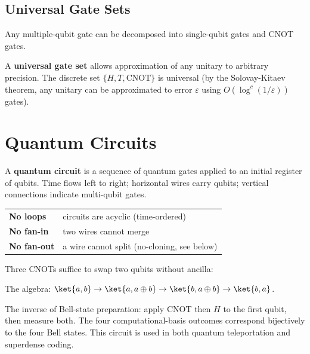 \documentclass[oneside]{academica}
\begin{document}
\subsection{Universal Gate Sets}

\begin{theorem*}
  Any multiple-qubit gate can be decomposed into single-qubit gates and CNOT gates.
\end{theorem*}

A \textbf{universal gate set} allows approximation of any unitary to arbitrary precision.
The discrete set $\{H, T, \mathrm{CNOT}\}$ is universal (by the Solovay-Kitaev theorem, any unitary can be approximated to error $\varepsilon$ using $O(\log^c(1/\varepsilon))$ gates).

\section{Quantum Circuits}

A \textbf{quantum circuit} is a sequence of quantum gates applied to an initial register of qubits.
Time flows left to right; horizontal wires carry qubits; vertical connections indicate multi-qubit gates.

\begin{center}
  \begin{tabular}{ll}
    \textbf{No loops} & circuits are acyclic (time-ordered) \\
    \textbf{No fan-in} & two wires cannot merge \\
    \textbf{No fan-out} & a wire cannot split (no-cloning, see below) \\
  \end{tabular}
\end{center}

\begin{example*}
  Three CNOTs suffice to swap two qubits without ancilla:
  \begin{center}
    
  \end{center}
  The algebra:
  $\ket{a,b}\to\ket{a,a\oplus b}\to\ket{b,a\oplus b}\to\ket{b,a}$.
\end{example*}

\begin{example*}
  The inverse of Bell-state preparation: apply CNOT then $H$ to the first qubit, then measure both.
  The four computational-basis outcomes correspond bijectively to the four Bell states.
  This circuit is used in both quantum teleportation and superdense coding.
\end{example*}
\end{document}

